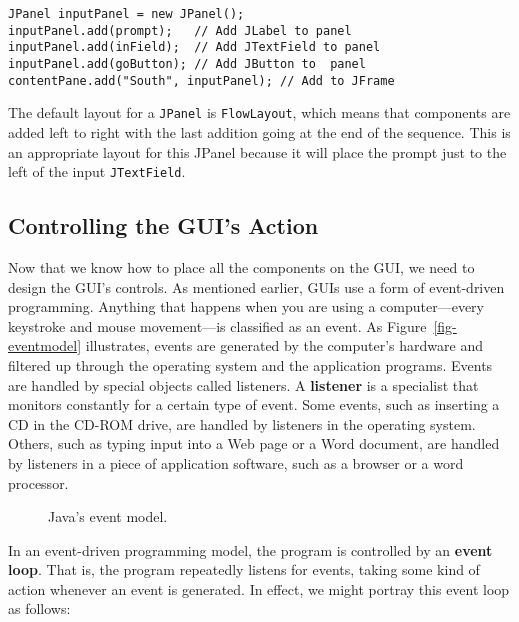 \begin{jjjlisting}
\begin{lstlisting}
JPanel inputPanel = new JPanel();
inputPanel.add(prompt);   // Add JLabel to panel
inputPanel.add(inField);  // Add JTextField to panel
inputPanel.add(goButton); // Add JButton to  panel
contentPane.add("South", inputPanel); // Add to JFrame
\end{lstlisting}
\end{jjjlisting}

\noindent The default layout for a {\tt JPanel} is {\tt FlowLayout},
which means that components are added left to right with the last
addition going at the end of the sequence.  This is an appropriate
layout for this JPanel because it will place the prompt just to the
left of the input {\tt JTextField}.




\subsection{Controlling the GUI's Action}

Now that we know how to place all the components on the GUI, we need
to design the GUI's controls.  As mentioned earlier, GUIs use a form
of event-driven programming. Anything that happens when you are using
a computer---every keystroke and mouse movement---is classified as an
event. As Figure~\ref{fig-eventmodel} illustrates, events are
generated by the computer's hardware and filtered up through the
operating system and the application programs. Events are handled by
special objects called listeners. A {\bf listener} is a specialist
that monitors constantly for a certain type of event.  Some events,
such as inserting a CD in the CD-ROM drive, are handled by listeners in
the operating system. Others, such as typing input into a Web page or a
Word document, are handled by listeners in a piece of application
software, such as a browser or a word processor.

\begin{figure}[tb]
{Java's event model.
\label{fig-eventmodel}
\label{pg-fig-eventmodel}}
\end{figure}

In an event-driven programming model, the program is controlled by
an {\bf event loop}. That is, the program repeatedly listens
for events, taking some kind of action whenever an event is generated.
In effect, we might portray this event loop as follows:

